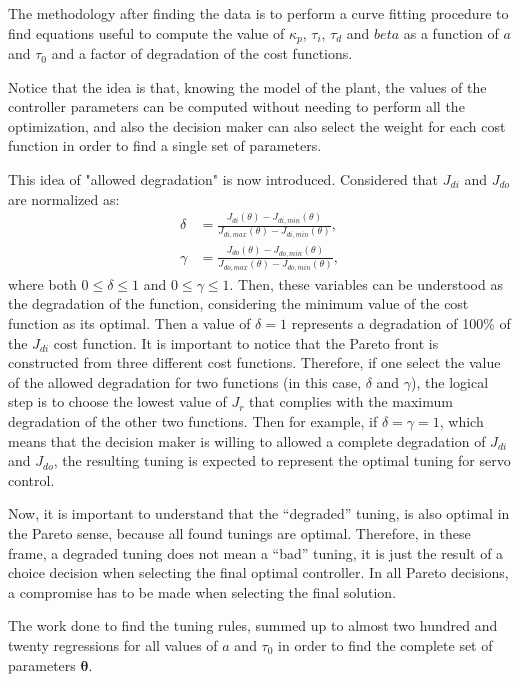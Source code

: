 The methodology after finding the data is to perform a curve fitting procedure to find equations useful to compute the value of $\kappa_p$, $\tau_i$, $\tau_d$ and $beta$ as a function of $a$ and $\tau_0$ and a factor of degradation of the cost functions.

Notice that the idea is that, knowing the model of the plant, the values of the controller parameters can be computed without needing to perform all the optimization, and also the decision maker can also select the weight for each cost function in order to find a single set of parameters.

This idea of "allowed degradation" is now introduced. Considered that $J_{di}$ and $J_{do}$ are normalized as:
%
\begin{align}
\delta &= \frac{J_{di}(\theta)-J_{di, min}(\theta)}{J_{di,max}(\theta)-J_{di,min}(\theta)},\label{eq:delta}\\
\gamma &= \frac{J_{do}(\theta)-J_{do, min}(\theta)}{J_{do,max}(\theta)-J_{do,min}(\theta)},\label{eq:gamma}
\end{align}
%
where both $0 \le \delta \le 1$ and $0 \le \gamma \le 1$. Then, these variables can be understood as the degradation of the function, considering the minimum value of the cost function as its optimal. Then a value of $\delta=1$ represents a degradation of 100\% of the $J_{di}$ cost function. It is important to notice that the Pareto front is constructed from three different cost functions. Therefore, if one select the value of the allowed degradation for two functions (in this case, $\delta$ and $\gamma$), the logical step is to choose the lowest value of $J_r$ that complies with the maximum degradation of the other two functions. Then for example,  if $\delta=\gamma=1$, which means that the decision maker is willing to allowed a complete degradation of $J_{di}$ and $J_{do}$, the resulting tuning is expected to represent the optimal tuning for servo control.

Now, it is important to understand that the ``degraded'' tuning, is also optimal in the Pareto sense, because all found tunings are optimal. Therefore, in these frame, a degraded tuning does not mean a ``bad'' tuning, it is just the result of a choice decision when selecting the final optimal controller. In all Pareto decisions, a compromise has to be made when selecting the final solution.

The work done to find the tuning rules, summed up to almost two hundred and twenty regressions for all values of $a$ and $\tau_0$ in order to find the complete set of parameters $\bm{\theta}$.


